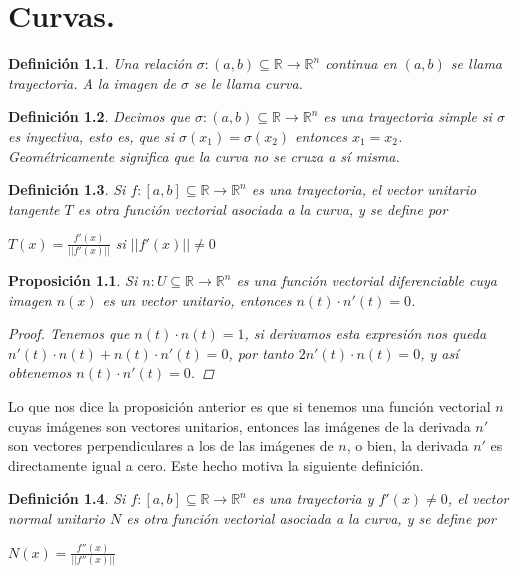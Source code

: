 \documentclass{book}
\newtheorem{proposition}{Proposición}[section]
\newtheorem{definition}{Definición}[section]
\begin{document}
\chapter{Curvas.}
\begin{definition}
Una relación $\sigma:(a,b)\subseteq \mathbb{R} \rightarrow \mathbb{R}^n$ continua en $(a,b)$ se llama trayectoria. A la imagen de $\sigma$ se le llama curva.
\end{definition}
\begin{definition}
Decimos que $\sigma:(a,b)\subseteq \mathbb{R} \rightarrow \mathbb{R}^n$ es una trayectoria simple si $\sigma$ es inyectiva, esto es, que si $\sigma(x_1)=\sigma(x_2)$ entonces $x_1=x_2$. Geométricamente significa que la curva no se cruza a sí misma.
\end{definition}
\begin{definition}
Si $f:[a,b]\subseteq \mathbb{R} \rightarrow \mathbb{R}^n$ es una trayectoria, el vector unitario tangente $T$ es otra función vectorial asociada a la curva, y se define por
\begin{center}
    $T(x)=\frac{f'(x)}{||f'(x)||}$ si $||f'(x)||\neq 0$
\end{center}
\end{definition}
\begin{proposition}
Si $n:U\subseteq \mathbb{R} \rightarrow \mathbb{R}^n$ es una función vectorial diferenciable cuya imagen $n(x)$ es un vector unitario, entonces $n(t)\cdot n'(t)=0$.
\begin{proof}
 Tenemos que $n(t)\cdot n(t)=1$, si derivamos esta expresión nos queda $n'(t)\cdot n(t)+n(t)\cdot n'(t)=0$, por tanto $2n'(t)\cdot n(t)=0$, y así obtenemos $n(t)\cdot n'(t)=0$.
\end{proof}
\end{proposition}
Lo que nos dice la proposición anterior es que si tenemos una función vectorial $n$ cuyas imágenes son vectores unitarios, entonces las imágenes de la derivada $n'$ son vectores perpendiculares a los de las imágenes de $n$, o bien, la derivada $n'$ es directamente igual a cero. Este hecho motiva la siguiente definición.
\begin{definition}
Si $f:[a,b]\subseteq \mathbb{R} \rightarrow \mathbb{R}^n$ es una trayectoria y $f'(x)\neq 0$, el vector normal unitario $N$ es otra función vectorial asociada a la curva, y se define por
\begin{center}
    $N(x)=\frac{f''(x)}{||f''(x)||}$
\end{center}
\end{definition}
\end{document}
